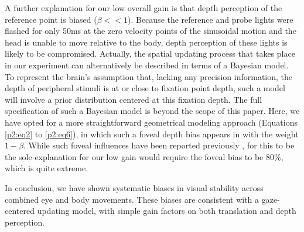 A further explanation for our low overall gain is that depth perception of the reference point is biased ($\beta << 1$). Because the reference and probe lights were flashed for only 50ms at the zero velocity points of the sinusoidal motion and the head is unable to move relative to the body, depth perception of these lights is likely to be compromised. Actually, the spatial updating process that takes place in our experiment can alternatively be described in terms of a Bayesian model. To represent the brain's assumption that, lacking any precision information, the depth of peripheral stimuli is at or close to fixation point depth, such a model will involve a prior distribution centered at this fixation depth. The full specification of such a Bayesian model is beyond the scope of this paper. Here, we have opted for a more straightforward geometrical modeling approach (Equations \ref{p2:eq2} to \ref{p2:eq6}), in which such a foveal depth bias appears in  with the weight $1 - \beta$. While such foveal influences have been reported previously \cite{brenner2008, mateeff1983}, for this to be the sole explanation for our low gain would require the foveal bias to be 80\%, which is quite extreme.

In conclusion, we have shown systematic biases in visual stability across combined eye and body movements. These biases are consistent with a gaze-centered updating model, with simple gain factors on both translation and depth perception.  

